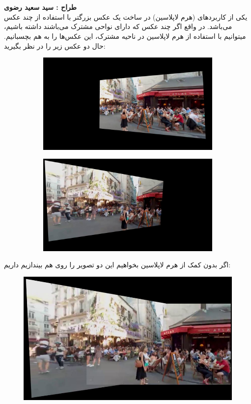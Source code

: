 \documentclass[a4]{article}
\begin{document}
\section{}
\textbf{طراح :‌ سید سعید رضوی}
\vspace{0.5cm}
\\
یکی از کاربرد‌های
(هرم لاپلاسین) در ساخت یک عکس بزرگتر با استفاده از چند عکس می‌باشد. در واقع اگر چند عکس که دارای نواحی مشترک می‌باشند داشته باشیم، میتوانیم با استفاده از هرم لاپلاسین در ناحیه مشترک، این عکس‌ها را به هم بچسبانیم. حال دو عکس زیر را در نظر بگیرید:
\begin{figure}[H]
	\centering
	\begin{subfigure}{.5\textwidth}
		\centering
		\includegraphics[width=.9\linewidth]{q2_1}
	\end{subfigure}%
	\begin{subfigure}{.5\textwidth}
		\centering
		\includegraphics[width=.9\linewidth]{q2_0}
	\end{subfigure}
	\caption{}
\end{figure}
اگر بدون کمک از هرم لاپلاسین بخواهیم این دو تصویر را روی هم بیندازیم داریم: 
	\begin{figure}[H]
		\centering
		\includegraphics[width=0.6 \linewidth]{q2_2}
		\caption{
		}
		
	\end{figure}
\end{document}
